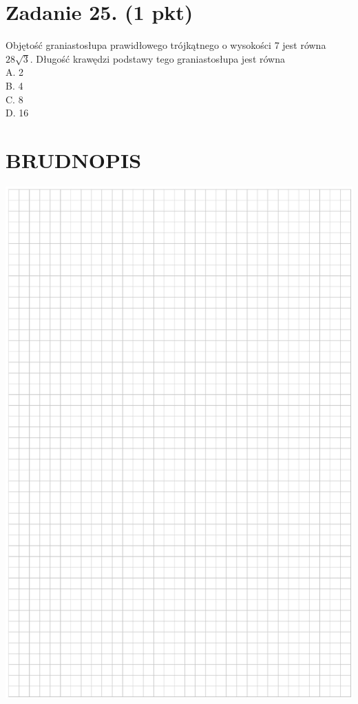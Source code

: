 \documentclass[10pt]{article}
\begin{document}
\section*{Zadanie 25. (1 pkt)}
Objętość graniastosłupa prawidłowego trójkątnego o wysokości 7 jest równa \(28 \sqrt{3}\). Długość krawędzi podstawy tego graniastosłupa jest równa\\
A. 2\\
B. 4\\
C. 8\\
D. 16

\section*{BRUDNOPIS}
\begin{center}
\includegraphics[max width=\textwidth]{2024_11_21_e0e8aab895018a50a9a7g-09}
\end{center}
\end{document}
